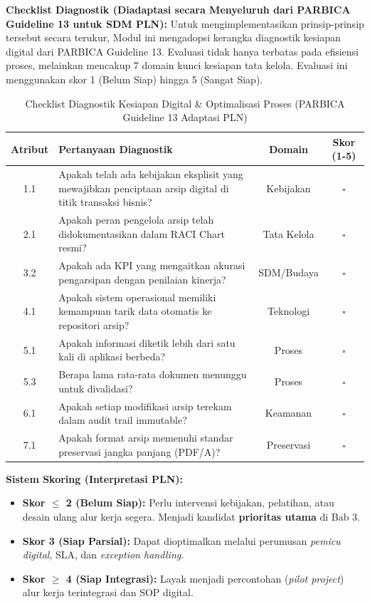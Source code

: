 \documentclass[12pt,a4paper]{report}
\begin{document}
\textbf{Checklist Diagnostik (Diadaptasi secara Menyeluruh dari PARBICA Guideline 13 untuk SDM PLN):}
Untuk mengimplementasikan prinsip-prinsip tersebut secara terukur, Modul ini mengadopsi kerangka diagnostik kesiapan digital dari PARBICA Guideline 13. Evaluasi tidak hanya terbatas pada efisiensi proses, melainkan mencakup 7 domain kunci kesiapan tata kelola. Evaluasi ini menggunakan skor 1 (Belum Siap) hingga 5 (Sangat Siap).

\begin{table}[htbp]
\centering
\small
\caption{Checklist Diagnostik Kesiapan Digital \& Optimalisasi Proses (PARBICA Guideline 13 Adaptasi PLN)}
\begin{tabularx}{\textwidth}{@{} c >{\raggedright\arraybackslash}X c c @{}}
\toprule
\textbf{Atribut} & \textbf{Pertanyaan Diagnostik} & \textbf{Domain} & \textbf{Skor (1-5)} \\
\midrule
1.1 & Apakah telah ada kebijakan eksplisit yang mewajibkan penciptaan arsip digital di titik transaksi bisnis? & Kebijakan & $\square$ \\
2.1 & Apakah peran pengelola arsip telah didokumentasikan dalam RACI Chart resmi? & Tata Kelola & $\square$ \\
3.2 & Apakah ada KPI yang mengaitkan akurasi pengarsipan dengan penilaian kinerja? & SDM/Budaya & $\square$ \\
4.1 & Apakah sistem operasional memiliki kemampuan tarik data otomatis ke repositori arsip? & Teknologi & $\square$ \\
5.1 & Apakah informasi diketik lebih dari satu kali di aplikasi berbeda? & Proses & $\square$ \\
5.3 & Berapa lama rata-rata dokumen menunggu untuk divalidasi? & Proses & $\square$ \\
6.1 & Apakah setiap modifikasi arsip terekam dalam audit trail immutable? & Keamanan & $\square$ \\
7.1 & Apakah format arsip memenuhi standar preservasi jangka panjang (PDF/A)? & Preservasi & $\square$ \\
\bottomrule
\end{tabularx}
\end{table}

\textbf{Sistem Skoring (Interpretasi PLN):}
\begin{itemize}[leftmargin=*]
    \item \textbf{Skor $\leq$ 2 (Belum Siap):} Perlu intervensi kebijakan, pelatihan, atau desain ulang alur kerja segera. Menjadi kandidat \textbf{prioritas utama} di Bab 3.
    \item \textbf{Skor 3 (Siap Parsial):} Dapat dioptimalkan melalui perumusan \textit{pemicu digital}, SLA, dan \textit{exception handling}.
    \item \textbf{Skor $\geq$ 4 (Siap Integrasi):} Layak menjadi percontohan (\textit{pilot project}) alur kerja terintegrasi dan SOP digital.
\end{itemize}
\end{document}
